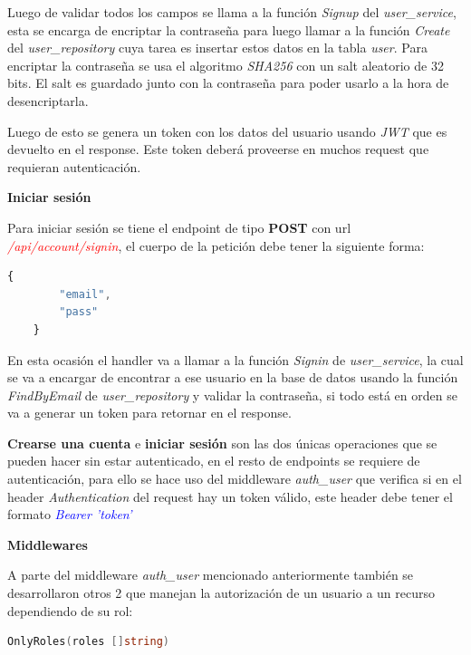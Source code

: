 Luego de validar todos los campos se llama a la función \textit{Signup} del \textit{user\_service}, esta se encarga de encriptar la contraseña para luego llamar a la función \textit{Create} del \textit{user\_repository} cuya tarea es insertar estos datos en la tabla \textit{user}. Para encriptar la contraseña se usa el algoritmo \textit{SHA256} con un salt aleatorio de 32 bits. El salt es guardado junto con la contraseña para poder usarlo a la hora de desencriptarla.
\newline

Luego de esto se genera un token con los datos del usuario usando \textit{JWT} que es devuelto en el response. Este token deberá proveerse en muchos request que requieran autenticación.
\newline

\textbf{Iniciar sesión}

Para iniciar sesión se tiene el endpoint de tipo \textbf{POST} con url \textit{\textcolor{red}{/api/account/signin}}, el cuerpo de la petición debe tener la siguiente forma:

\begin{lstlisting}[language=javascript]
	{
		"email",
		"pass"
	}
\end{lstlisting}

En esta ocasión el handler va a llamar a la función \textit{Signin} de \textit{user\_service}, la cual se va a encargar de encontrar a ese usuario en la base de datos usando la función \textit{FindByEmail} de \textit{user\_repository} y validar la contraseña, si todo está en orden se va a generar un token para retornar en el response.
\newline

\textbf{Crearse una cuenta} e \textbf{iniciar sesión} son las dos únicas operaciones que se pueden hacer sin estar autenticado, en el resto de endpoints se requiere de autenticación, para ello se hace uso del middleware \textit{auth\_user} que verifica si en el header \textit{Authentication} del request hay un token válido, este header debe tener el formato \textit{\textcolor{blue}{Bearer 'token'}}
\newline

\textbf{Middlewares}

A parte del middleware \textit{auth\_user} mencionado anteriormente también se desarrollaron otros 2 que manejan la autorización de un usuario a un recurso dependiendo de su rol:

\begin{lstlisting}[language=go]
	OnlyRoles(roles []string)
\end{lstlisting}


